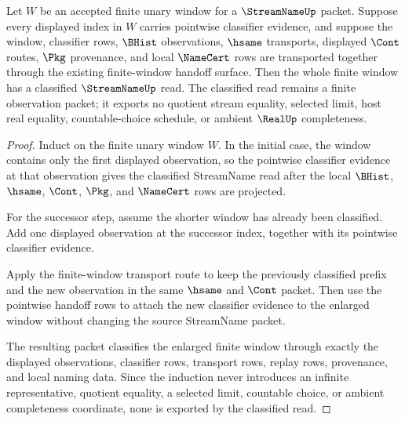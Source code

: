 \begin{theorem}
\label{thm:streamname-pointwise-classifier-induction}
Let $W$ be an accepted finite unary window for a $\StreamNameUp$ packet. Suppose every displayed index in $W$ carries pointwise classifier evidence, and suppose the window, classifier rows, $\BHist$ observations, $\hsame$ transports, displayed $\Cont$ routes, $\Pkg$ provenance, and local $\NameCert$ rows are transported together through the existing finite-window handoff surface. Then the whole finite window has a classified $\StreamNameUp$ read. The classified read remains a finite observation packet; it exports no quotient stream equality, selected limit, host real equality, countable-choice schedule, or ambient $\RealUp$ completeness.
\end{theorem}
\begin{proof}
Induct on the finite unary window $W$. In the initial case, the window contains only the first displayed observation, so the pointwise classifier evidence at that observation gives the classified StreamName read after the local $\BHist$, $\hsame$, $\Cont$, $\Pkg$, and $\NameCert$ rows are projected.

For the successor step, assume the shorter window has already been classified. Add one displayed observation at the successor index, together with its pointwise classifier evidence.

Apply the finite-window transport route to keep the previously classified prefix and the new observation in the same $\hsame$ and $\Cont$ packet. Then use the pointwise handoff rows to attach the new classifier evidence to the enlarged window without changing the source StreamName packet.

The resulting packet classifies the enlarged finite window through exactly the displayed observations, classifier rows, transport rows, replay rows, provenance, and local naming data. Since the induction never introduces an infinite representative, quotient equality, a selected limit, countable choice, or ambient completeness coordinate, none is exported by the classified read.
\end{proof}

